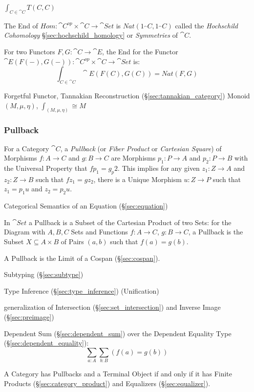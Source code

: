 $\int_{C \in \cat{C}} T(C,C)$

The End of $Hom : \cat{C}^{op} \times \cat{C} \rightarrow
\cat{Set}$ is $Nat (1_\cat{C},1_\cat{C})$ called the
\emph{Hochschild Cohomology} \S\ref{sec:hochschild_homology} or
\emph{Symmetries} of $\cat{C}$.

For two Functors $F,G : \cat{C} \rightarrow \cat{E}$, the End for
the Functor $\cat{E}(F(-), G(-)) : \cat{C}^{op} \times
\cat{C} \rightarrow \cat{Set}$ is:
\[
  \int_{C \in \cat{C}} \cat{E}(F(C), G(C)) = Nat (F,G)
\]

Forgetful Functor, Tannakian Reconstruction
(\S\ref{sec:tannakian_category}) %
Monoid $(M,\mu,\eta)$, $\int_{(M,\mu,\eta)} \cong M$



\subsubsection{Pullback}\label{sec:pullback}

For a Category $\cat{C}$, a \emph{Pullback} (or \emph{Fiber
  Product} or \emph{Cartesian Square}) of Morphisms $f : A \rightarrow
C$ and $g : B \rightarrow C$ are Morphisms $p_1 : P \rightarrow A$ and
$p_2 : P \rightarrow B$ with the Universal Property that $fp_1 =
g_p2$. This implies for any given $z_1 : Z \rightarrow A$ and $z_2 : Z
\rightarrow B$ such that $fz_1 = gz_2$, there is a Unique Morphism $u
: Z \rightarrow P$ such that $z_1 = p_1 u$ and $z_2 = p_2 u$.

Categorical Semantics of an Equation (\S\ref{sec:equation})

In $\cat{Set}$ a Pullback is a Subset of the Cartesian Product of two
Sets: for the Diagram with $A,B,C$ Sets and Functions $f : A
\rightarrow C$, $g : B \rightarrow C$, a Pullback is the Subset $X
\subseteq A \times B$ of Pairs $(a,b)$ such that $f(a) = g(b)$.

A Pullback is the Limit of a Cospan (\S\ref{sec:cospan}).

Subtyping (\S\ref{sec:subtype})

Type Inference (\S\ref{sec:type_inference}) (Unification)

generalization of Intersection (\S\ref{sec:set_intersection}) and
Inverse Image (\S\ref{sec:preimage})

Dependent Sum (\S\ref{sec:dependent_sum}) over the Dependent Equality
Type (\S\ref{sec:dependent_equality}):
\[
  \sum_{a:A} \sum_{b:B} (f(a) = g(b))
\]

A Category has Pullbacks and a Terminal Object if and only if it has
Finite Products (\S\ref{sec:category_product}) and Equalizers
(\S\ref{sec:equalizer}). \cite{awodey06}

